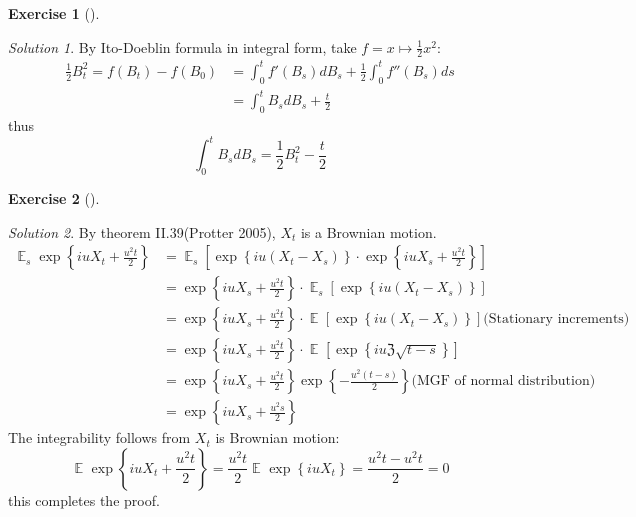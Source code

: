 \documentclass[
]{article}
\theoremstyle{definition}
\theoremstyle{definition}
\theoremstyle{definition}
\newtheorem{exercise}{Exercise}
\theoremstyle{definition}
\theoremstyle{remark}
\newtheorem*{solution}{Solution}
\begin{document}
\begin{exercise}[]
\(\quad\)
\end{exercise}

\begin{solution}
By Ito-Doeblin formula in integral form, take \(f=x \mapsto \frac{1}{2}x^2\):
\[
\begin{aligned}
    \frac{1}{2}B_{t}^2=f(B_{t})-f(B_0)&=\int_{0}^{t} f'(B_{s})dB_{s}+\frac{1}{2} \int _{0}^{t} f''(B_{s})ds
    \\ &=  \int_{0}^{t} B_{s} dB_{s}+\frac{t}{2}
\end{aligned}
\]
thus
\[
\int_{0}^{t} B_{s}dB_{s}=\frac{1}{2}B_{t}^2-\frac{t}{2}
\]
\end{solution}

\begin{exercise}[]
\(\quad\)
\end{exercise}

\begin{solution}
By theorem II.39(Protter 2005), \(X_{t}\) is a Brownian motion.
\[
\begin{aligned}
    \mathop{{}\mathbb{E}}_{s}\exp \left\{ iuX_{t}+ \frac{u^2t}{2} \right\}
    &=
    \mathop{{}\mathbb{E}}_{s} \left[ \exp \left\{ iu(X_{t}-X_{s}) \right\} \cdot \exp \left\{ iuX_{s}+\frac{u^2t}{2} \right\} \right]
    \\ &= 
    \exp \left\{ iuX_{s}+\frac{u^2t}{2} \right\}\cdot\mathop{{}\mathbb{E}}_{s} \left[ \exp \left\{ iu(X_{t}-X_{s}) \right\} \right]
    \\ &= 
    \exp \left\{ iuX_{s}+\frac{u^2t}{2} \right\}\cdot\mathop{{}\mathbb{E}}_{} \left[ \exp \left\{ iu(X_{t}-X_{s}) \right\} \right] \text{(Stationary increments)}
    \\ &= 
    \exp \left\{ iuX_{s}+\frac{u^2t}{2} \right\}\cdot\mathop{{}\mathbb{E}}_{} \left[ \exp \left\{ iu \mathfrak{Z} \sqrt{t-s} \right\} \right]
    \\ &= 
    \exp \left\{ iuX_{s}+\frac{u^2t}{2} \right\} \exp \left\{ -\frac{u^2(t-s)}{2} \right\} \text{(MGF of normal distribution)}
    \\ &= 
    \exp \left\{ iuX_{s}+\frac{u^2s}{2} \right\}     
\end{aligned}
\]
The integrability follows from \(X_{t}\) is Brownian motion:
\[
\mathop{{}\mathbb{E}}_{}\exp \left\{ iuX_{t}+ \frac{u^2t}{2} \right\}= \frac{u^2t}{2} \mathop{{}\mathbb{E}}_{}\exp \left\{ iuX_{t} \right\}=\frac{u^2t-u^2t}{2}=0
\]
this completes the proof.
\end{solution}
\end{document}

